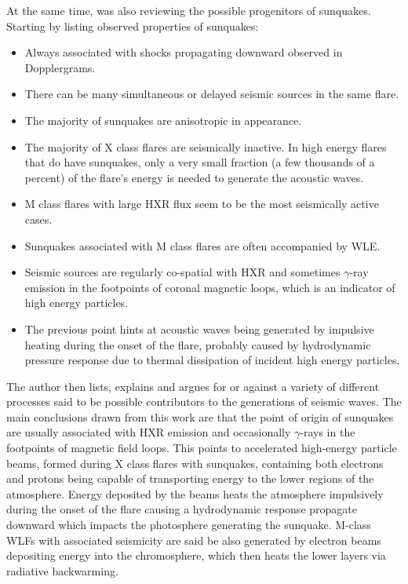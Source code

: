 \documentclass[11pt]{article}
\begin{document}
At the same time, \cite{2008SoPh..251..641Z} was also reviewing the possible progenitors of sunquakes. Starting by listing observed properties of sunquakes:
\begin{itemize}
\item Always associated with shocks propagating downward observed in Dopplergrams.
\item There can be many simultaneous or delayed seismic sources in the same flare.
\item The majority of sunquakes are anisotropic in appearance.
\item The majority of X class flares are seismically inactive. In high energy flares that do have sunquakes, only a very small fraction (a few thousands of a percent) of the flare's energy is needed to generate the acoustic waves. 
\item M class flares with large HXR flux seem to be the most seismically active cases.
\item Sunquakes associated with M class flares are often accompanied by WLE.
\item Seismic sources are regularly co-spatial with HXR and sometimes $\gamma$-ray emission in the footpoints of coronal magnetic loops, which is an indicator of high energy particles.
\item The previous point hints at acoustic waves being generated by impulsive heating during the onset of the flare, probably caused by hydrodynamic pressure response due to thermal dissipation of incident high energy particles.
\end{itemize}
The author then lists, explains and argues for or against a variety of different processes said to be possible contributors to the generations of seismic waves. The main conclusions drawn from this work are that the point of origin of sunquakes are usually associated with HXR emission and occasionally $\gamma$-rays in the footpoints of magnetic field loops. This points to accelerated high-energy particle beams, formed during X class flares with sunquakes, containing both electrons and protons being capable of transporting energy to the lower regions of the atmosphere. Energy deposited by the beams heats the atmosphere impulsively during the onset of the flare causing a hydrodynamic response propagate downward which impacts the photosphere generating the sunquake. M-class WLFs with associated seismicity are said be also generated by electron beams depositing energy into the chromosphere, which then heats the lower layers via radiative backwarming.\\
\end{document}

